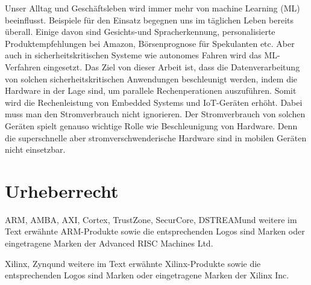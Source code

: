 Unser Alltag und Geschäftsleben wird immer mehr von machine Learning (ML) beeinflusst. Beispiele für den Einsatz begegnen uns im täglichen Leben bereits überall. Einige davon sind Gesichts-und Spracherkennung, personalisierte Produktempfehlungen bei Amazon, Börsenprognose für Spekulanten etc. Aber auch in sicherheitskritischen Systeme wie autonomes Fahren wird das ML-Verfahren eingesetzt. Das Ziel von dieser Arbeit ist, dass die Datenverarbeitung von solchen sicherheitskritischen Anwendungen beschleunigt werden, indem die Hardware in der Lage sind, um parallele Rechenperationen auszuführen. Somit wird die Rechenleistung von Embedded Systems und IoT-Geräten erhöht. Dabei muss man den Stromverbrauch nicht ignorieren. Der Stromverbrauch von solchen Geräten spielt genauso wichtige Rolle wie Beschleunigung von Hardware. Denn die superschnelle  aber stromverschwenderische Hardware sind in mobilen Geräten nicht einsetzbar.



\chapter*{Urheberrecht}

ARM\TReg, AMBA\TReg, AXI\TTra, Cortex\TTra, TrustZone\TTra, SecurCore\TTra  , DSTREAM\TTra und weitere im Text erwähnte ARM-Produkte sowie die entsprechenden Logos sind Marken oder eingetragene Marken der Advanced RISC Machines Ltd.\par
\vspace{0.5cm}
Xilinx\TReg, Zynq\TTra und weitere im Text erwähnte Xilinx-Produkte sowie die entsprechenden Logos sind Marken oder eingetragene Marken der Xilinx Inc.\par
\vspace{0.5cm}